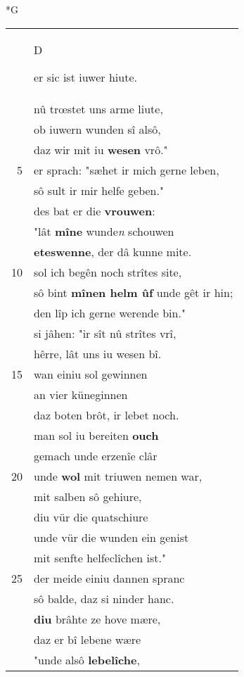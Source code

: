 \documentclass[8pt,a4paper,notitlepage]{article}
\begin{document}
\begin{table}[ht]
\begin{minipage}[t]{0.5\linewidth}
\small
\begin{center}*G
\end{center}
\begin{tabular}{rl}
 & \begin{large}D\end{large}er sic ist iuwer hiute.\\ 
 & nû trœstet uns arme liute,\\ 
 & ob iuwern wunden sî alsô,\\ 
 & daz wir mit iu \textbf{wesen} vrô."\\ 
5 & er sprach: "sæhet ir mich gerne leben,\\ 
 & sô sult ir mir helfe geben."\\ 
 & des bat er die \textbf{vrouwen}:\\ 
 & "lât \textbf{mîne} wunde\textit{n} schouwen\\ 
 & \textbf{eteswenne}, der dâ kunne mite.\\ 
10 & sol ich begên noch strîtes site,\\ 
 & sô bint \textbf{mînen helm ûf} unde gêt ir hin;\\ 
 & den lîp ich gerne werende bin."\\ 
 & si jâhen: "ir sît nû strîtes vrî,\\ 
 & hêrre, lât uns iu wesen bî.\\ 
15 & wan einiu sol gewinnen\\ 
 & an vier küneginnen\\ 
 & daz boten brôt, ir lebet noch.\\ 
 & man sol iu bereiten \textbf{ouch}\\ 
 & gemach unde erzenîe clâr\\ 
20 & unde \textbf{wol} mit triuwen nemen war,\\ 
 & mit salben sô gehiure,\\ 
 & diu vür die quatschiure\\ 
 & unde vür die wunden ein genist\\ 
 & mit senfte helfeclîchen ist."\\ 
25 & der meide einiu dannen spranc\\ 
 & sô balde, daz si ninder hanc.\\ 
 & \textbf{diu} brâhte ze hove mære,\\ 
 & daz er bî lebene wære\\ 
 & "unde alsô \textbf{lebelîche},\\ 

\end{tabular}
\end{minipage}
\end{table}
\end{document}
